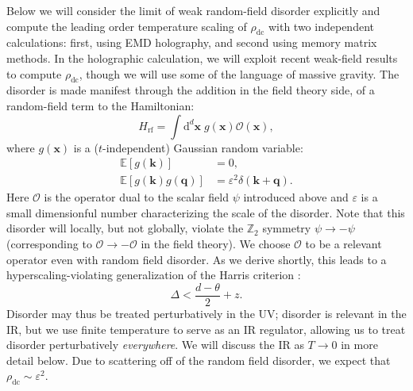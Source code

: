 \documentclass[10pt, oneside]{book}
\begin{document}
\begin{doublespace}
Below we will  
consider the limit of weak random-field disorder explicitly and compute the leading order temperature scaling of $\rho_{\mathrm{dc}}$ with two independent calculations:  first, using EMD holography, and second using memory matrix methods.
In the holographic calculation, we will  %
exploit recent weak-field results \cite{Blake:2013bqa, Blake:2013owa, Gouteraux:2014hca} to compute $\rho_{\mathrm{dc}}$, though we will use some of the language of massive gravity.
The disorder is made manifest through the addition %
in the field theory side, of %
a random-field term to the Hamiltonian: \begin{equation}
H_{\mathrm{rf}} = \int \mathrm{d}^d\mathbf{x} \; g(\mathbf{x}) \mathcal{O}(\mathbf{x}),
\end{equation}where $g(\mathbf{x})$ is a ($t$-independent) Gaussian random variable: 
\begin{subequations}\label{eq:6}\begin{align}
\mathbb{E}[g(\mathbf{k})]&=0, \\
\mathbb{E}[g(\mathbf{k})g(\mathbf{q})] &= \varepsilon^2 \delta(\mathbf{k}+\mathbf{q}).
\end{align}\end{subequations}
Here $\mathcal{O}$ is the operator dual to the scalar field $\psi$ introduced above and $\varepsilon$ is a small dimensionful number characterizing the scale of the disorder.  Note that this disorder will locally, but not globally, violate the $\mathbb{Z}_2$ symmetry $\psi \rightarrow -\psi$ (corresponding to $\mathcal{O}\rightarrow -\mathcal{O}$ in the field theory).   We choose $\mathcal{O}$ to be a relevant operator even with random field disorder.   As we derive shortly, this leads to a hyperscaling-violating generalization of the Harris criterion \cite{Hartnoll:2008hs}: \begin{equation}
{\Delta < \frac{d-\theta}{2}+z.}  \label{eqharris}
\end{equation} Disorder may thus be treated perturbatively in the UV; disorder is relevant in the IR, but we use  
finite temperature to serve as an IR regulator, allowing us to 
treat disorder perturbatively \emph{everywhere}.  We will discuss the IR as $T\rightarrow 0$ in more detail below.
%
Due to scattering off of the random %
field disorder, we expect that $\rho_{\mathrm{dc}} \sim \varepsilon^2$.   %


\end{doublespace}
\end{document}
